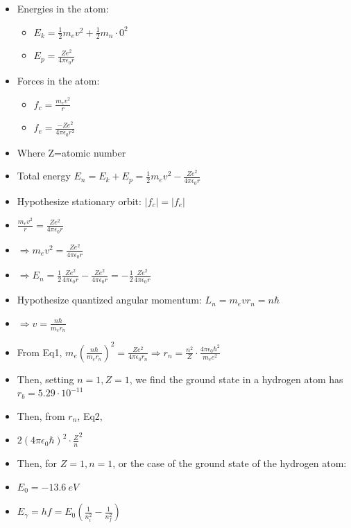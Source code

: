 \documentclass{article}
\begin{document}
\begin{itemize}
    \item Energies in the atom:
    \begin{itemize}
        \item \(E_k=\frac{1}{2}m_e v^2+\frac{1}{2}m_n\cdot 0^2\)
        \item \(E_p=\frac{Ze^2}{4\pi\epsilon_0 r}\)
    \end{itemize}
    \item Forces in the atom:
    \begin{itemize}
        \item \(f_c=\frac{m_e v^2}{r}\)
        \item \(f_e=\frac{-Ze^2}{4\pi\epsilon_0 r^2}\)
    \end{itemize}

    \item Where Z=atomic number

    \item Total energy \(E_n=E_k+E_p=\frac{1}{2}m_e v^2 -\frac{Ze^2}{4\pi\epsilon_0 r}\)
    \item Hypothesize stationary orbit: \(|f_c|=|f_e|\)
    \item \(\frac{m_e v^2}{r}=\frac{Ze^2}{4\pi\epsilon_0 r}\)
    \item \(\Rightarrow m_e v^2=\frac{Ze^2}{4\pi\epsilon_0 r}\)
    \item \(\Rightarrow E_n=\frac{1}{2}\frac{Ze^2}{4\pi\epsilon_0 r}-\frac{Ze^2}{4\pi\epsilon_0 r}=-\frac{1}{2}\frac{Ze^2}{4\pi\epsilon_0 r}\)

    \item Hypothesize quantized angular momentum: \(L_n=m_evr_n=n\hbar\)
    \item \(\Rightarrow v=\frac{n\hbar}{m_er_n}\)
    \item From Eq1, \(m_e(\frac{n\hbar}{m_er_n})^2=\frac{Ze^2}{4\pi\epsilon_0 r_n}\Rightarrow r_n=\frac{n^2}{Z}\cdot\frac{4\pi\epsilon_0\hbar^2}{m_e e^2}\)
    \item Then, setting \(n=1, Z=1\), we find the ground state in a hydrogen atom has \(r_b=5.29\cdot 10^{-11}\)
    \item Then, from \(r_n\), Eq2, 
    \item \({2(4\pi\epsilon_0\hbar)^2}\cdot\frac{Z}{n}^2\)
    \item Then, for \(Z=1, n=1\), or the case of the ground state of the hydrogen atom:
    \item \(E_0=-13.6 ~eV\)
    \item \(\boxed{E_{\gamma}=hf=E_0(\frac{1}{n_i^2}-\frac{1}{n_f^2})}\)
\end{itemize}
\end{document}
